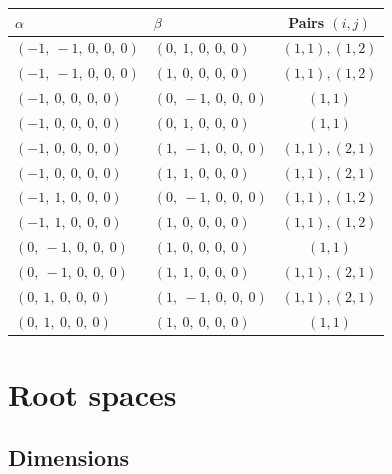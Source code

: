 \documentclass[11pt]{article}
\theoremstyle{definition}
\begin{document}
\begin{tabular}{|l|l|c|}
    \hline
    $\alpha$ & $\beta$ & Pairs $(i,j)$ \\
    \hline
    $\left( -1, \  -1, \  0, \  0, \  0\right)$ & $\left( 0, \  1, \  0, \  0, \  0\right)$ & $(1,1), (1,2)$ \\
    \hline
    $\left( -1, \  -1, \  0, \  0, \  0\right)$ & $\left( 1, \  0, \  0, \  0, \  0\right)$ & $(1,1), (1,2)$ \\
    \hline
    $\left( -1, \  0, \  0, \  0, \  0\right)$ & $\left( 0, \  -1, \  0, \  0, \  0\right)$ & $(1,1)$ \\
    \hline
    $\left( -1, \  0, \  0, \  0, \  0\right)$ & $\left( 0, \  1, \  0, \  0, \  0\right)$ & $(1,1)$ \\
    \hline
    $\left( -1, \  0, \  0, \  0, \  0\right)$ & $\left( 1, \  -1, \  0, \  0, \  0\right)$ & $(1,1), (2,1)$ \\
    \hline
    $\left( -1, \  0, \  0, \  0, \  0\right)$ & $\left( 1, \  1, \  0, \  0, \  0\right)$ & $(1,1), (2,1)$ \\
    \hline
    $\left( -1, \  1, \  0, \  0, \  0\right)$ & $\left( 0, \  -1, \  0, \  0, \  0\right)$ & $(1,1), (1,2)$ \\
    \hline
    $\left( -1, \  1, \  0, \  0, \  0\right)$ & $\left( 1, \  0, \  0, \  0, \  0\right)$ & $(1,1), (1,2)$ \\
    \hline
    $\left( 0, \  -1, \  0, \  0, \  0\right)$ & $\left( 1, \  0, \  0, \  0, \  0\right)$ & $(1,1)$ \\
    \hline
    $\left( 0, \  -1, \  0, \  0, \  0\right)$ & $\left( 1, \  1, \  0, \  0, \  0\right)$ & $(1,1), (2,1)$ \\
    \hline
    $\left( 0, \  1, \  0, \  0, \  0\right)$ & $\left( 1, \  -1, \  0, \  0, \  0\right)$ & $(1,1), (2,1)$ \\
    \hline
    $\left( 0, \  1, \  0, \  0, \  0\right)$ & $\left( 1, \  0, \  0, \  0, \  0\right)$ & $(1,1)$ \\
    \hline
\end{tabular}


\newpage
\section{Root spaces}

\subsection{Dimensions}
\end{document}
